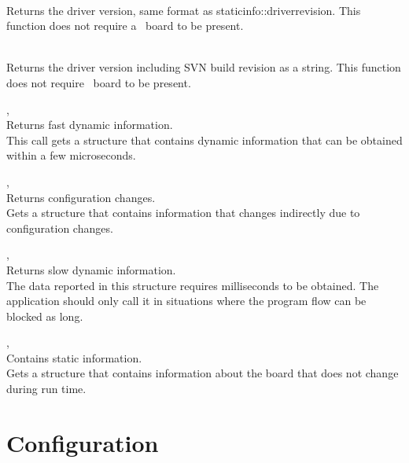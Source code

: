 			\\
			Returns the driver version, same format as \prefix static\tu info::driver\tu revision. This function does not require a \deviceName\ board to be present.

			\\
			Returns the driver version including SVN build revision as a string. This function does not require \deviceName\ board to be present.

			, \\
			Returns fast dynamic information.\\
			This call gets a structure that contains dynamic information that can be obtained within a few microseconds.\par

			, \\
			Returns configuration changes.\\
			Gets a structure that contains information that changes indirectly due to configuration changes.\par

			, \\
			Returns slow dynamic information.\\
			The data reported in this structure requires milliseconds to be obtained. 
			The application should only call it in situations where the program flow can be blocked as long.\par

			,\\
			Contains static information.\\
			Gets a structure that contains information about the board that does not change during run time.\par
	
	

	

	\section{Configuration}


